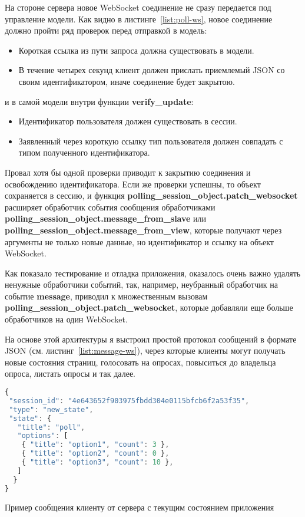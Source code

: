 На стороне сервера новое WebSocket соединение не сразу передается под управление модели. Как видно в листинге~\ref{list:poll-ws}, новое соединение должно пройти ряд проверок перед отправкой в модель:
   \begin{itemize}
   	\item Короткая ссылка из пути запроса должна существовать в модели.
   	\item В течение четырех секунд клиент должен прислать приемлемый JSON со своим идентификатором, иначе соединение будет закрытою.
   \end{itemize}
и в самой модели внутри функции \textbf{verify\_update}:
    \begin{itemize}
 	\item Идентификатор пользователя должен существовать в сессии.
 	\item Заявленный через короткую ссылку тип пользователя должен совпадать с типом полученного идентификатора.
 	\end{itemize}
Провал хотя бы одной проверки приводит к закрытию соединения и освобождению идентификатора. Если же проверки успешны, то объект сохраняется в сессию, и функция  \textbf{polling\_session\_object.patch\_websocket} расширяет обработчик события сообщения обработчиками \textbf{polling\_session\_object.message\_from\_slave} или \textbf{polling\_session\_object.message\_from\_view}, которые получают через аргументы не только новые данные, но идентификатор и ссылку на объект WebSocket.

Как показало тестирование и отладка приложения, оказалось очень важно удалять ненужные обработчики событий, так, например, неубранный обработчик на событие \textbf{message}, приводил к множественным вызовам  \textbf{polling\_session\_object.patch\_websocket}, которые добавляли еще больше обработчиков на один WebSocket. 

На основе этой архитектуры я выстроил простой протокол сообщений в формате JSON (см. листинг~\ref{list:message-ws}), через которые клиенты могут получать новые состояния страниц, голосовать на опросах, повыситься до владельца опроса, листать опросы и так далее.
 \begin{ListingEnv}
 	\begin{lstlisting}[language=JavaScript]
{
 "session_id": "4e643652f903975fbdd304e0115bfcb6f2a53f35",
 "type": "new_state",
 "state": {
   "title": "poll",
   "options": [
	{ "title": "option1", "count": 3 },
	{ "title": "option2", "count": 0 },
	{ "title": "option3", "count": 10 },
   ]
  }
}
 	\end{lstlisting}
 	\caption{Пример сообщения клиенту от сервера с текущим состоянием приложения}
 	\label{list:message-ws}
 \end{ListingEnv}

